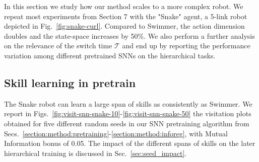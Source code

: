\documentclass{article} %
\begin{document}
In this section we study how our method scales to a more complex robot. We repeat most experiments from Section 7 with the "Snake" agent, a 5-link robot depicted in Fig.\ \ref{fig:snake-curl}. Compared to Swimmer, the action dimension doubles and the state-space increases by 50\%. We also perform a further analysis on the relevance of the switch time $\mathcal{T}$ and end up by reporting the performance variation among different pretrained SNNs on the hierarchical tasks.

\subsection{Skill learning in pretrain}
\label{sec:snake-pretrain}
The Snake robot can learn a large span of skills as consistently as Swimmer. We report in Figs.\ \ref{fig:visit-snn-snake-10}-\ref{fig:visit-snn-snake-50} the visitation plots obtained for five different random seeds in our SNN pretraining algorithm from Secs.\ \ref{section:method:pretraining}-\ref{section:method:inforeg}, with Mutual Information bonus of 0.05. The impact of the different spans of skills on the later hierarchical training is discussed in Sec.\ \ref{sec:seed_impact}.
\end{document}
